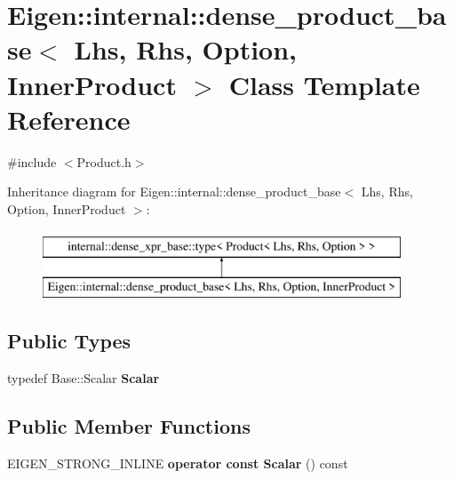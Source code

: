 \hypertarget{class_eigen_1_1internal_1_1dense__product__base_3_01_lhs_00_01_rhs_00_01_option_00_01_inner_product_01_4}{}\section{Eigen\+::internal\+::dense\+\_\+product\+\_\+base$<$ Lhs, Rhs, Option, Inner\+Product $>$ Class Template Reference}
\label{class_eigen_1_1internal_1_1dense__product__base_3_01_lhs_00_01_rhs_00_01_option_00_01_inner_product_01_4}


{\ttfamily \#include $<$Product.\+h$>$}

Inheritance diagram for Eigen\+::internal\+::dense\+\_\+product\+\_\+base$<$ Lhs, Rhs, Option, Inner\+Product $>$\+:\begin{figure}[H]
\begin{center}
\leavevmode
\includegraphics[height=2.000000cm]{class_eigen_1_1internal_1_1dense__product__base_3_01_lhs_00_01_rhs_00_01_option_00_01_inner_product_01_4}
\end{center}
\end{figure}
\subsection*{Public Types}
\begin{DoxyCompactItemize}
\item 
\mbox{\label{class_eigen_1_1internal_1_1dense__product__base_3_01_lhs_00_01_rhs_00_01_option_00_01_inner_product_01_4_abfe99694ea98255ca1d246365f3dcffe}} 
typedef Base\+::\+Scalar {\bfseries Scalar}
\end{DoxyCompactItemize}
\subsection*{Public Member Functions}
\begin{DoxyCompactItemize}
\item 
\mbox{\label{class_eigen_1_1internal_1_1dense__product__base_3_01_lhs_00_01_rhs_00_01_option_00_01_inner_product_01_4_ae78563f1ada9a271f4e910b17b89f2e5}} 
E\+I\+G\+E\+N\+\_\+\+S\+T\+R\+O\+N\+G\+\_\+\+I\+N\+L\+I\+NE {\bfseries operator const Scalar} () const
\end{DoxyCompactItemize}


